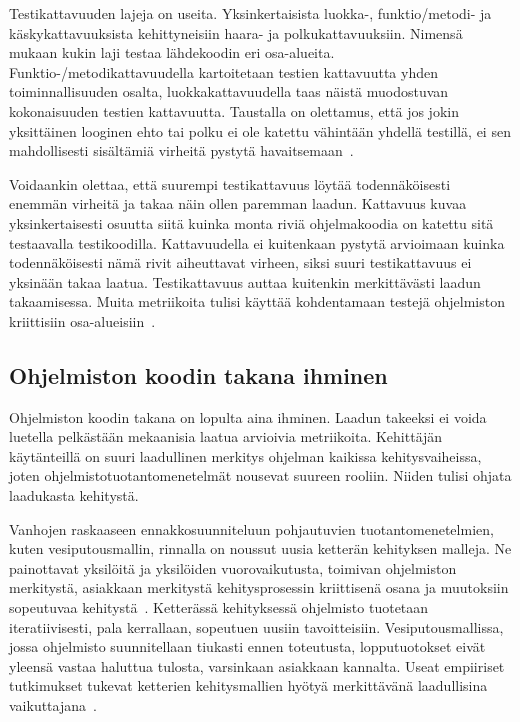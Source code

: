 \documentclass[finnish]{../tktltiki2}
\theoremstyle{definition}
\theoremstyle{remark}
\begin{document}
    Testikattavuuden lajeja on useita. Yksinkertaisista luokka-, funktio/metodi- ja käskykattavuuksista kehittyneisiin 
haara- ja polkukattavuuksiin. Nimensä mukaan kukin laji testaa lähdekoodin eri osa-alueita. Funktio-/metodikattavuu\-della 
kartoitetaan testien kattavuutta yhden toiminnallisuuden osalta, luokkakattavuudella taas näistä muodostuvan 
kokonaisuuden testien kattavuutta. Taustalla on olettamus, että jos jokin yksittäinen looginen ehto tai polku ei ole 
katettu vähintään yhdellä testillä, ei sen mahdollisesti sisältämiä virheitä pystytä havaitsemaan~\cite{MNDT09}.

    Voidaankin olettaa, että suurempi testikattavuus löytää todennäköisesti enemmän virheitä ja takaa näin ollen 
paremman laadun. Kattavuus kuvaa yksinkertaisesti osuutta siitä kuinka monta riviä ohjelmakoodia on katettu sitä 
testaavalla testikoodilla. Kattavuudella ei kuitenkaan pystytä arvioimaan kuinka todennäköisesti nämä rivit aiheuttavat 
virheen, siksi suuri testikattavuus ei yksinään takaa laatua. Testikattavuus auttaa kuitenkin merkittävästi laadun 
takaamisessa. Muita metriikoita tulisi käyttää kohdentamaan testejä ohjelmiston kriittisiin 
osa-alueisiin~\cite{NB07, MNDT09}.

\subsection{Ohjelmiston koodin takana ihminen}

Ohjelmiston koodin takana on lopulta aina ihminen.  Laadun takeeksi ei voida luetella pelkästään mekaanisia laatua 
arvioivia metriikoita. Kehittäjän käytänteillä on suuri laadullinen merkitys ohjelman kaikissa kehitysvaiheissa, joten 
ohjelmistotuotantomenetelmät nousevat suureen rooliin. Niiden tulisi ohjata laadukasta kehitystä.

    Vanhojen raskaaseen ennakkosuunniteluun pohjautuvien tuotantomenetelmien, kuten vesiputousmallin, rinnalla on 
noussut uusia ketterän kehityksen malleja. Ne painottavat yksilöitä ja yksilöiden vuorovaikutusta, toimivan ohjelmiston 
merkitystä, asiakkaan merkitystä kehitysprosessin kriittisenä osana ja muutoksiin sopeutuvaa kehitystä~\cite{BBB01}. 
Ketterässä kehityksessä ohjelmisto tuotetaan iteratiivisesti, pala kerrallaan, sopeutuen uusiin tavoitteisiin. 
Vesiputousmallissa, jossa ohjelmisto suunnitellaan tiukasti ennen toteutusta, lopputuotokset eivät yleensä vastaa 
haluttua tulosta, varsinkaan asiakkaan kannalta. Useat empiiriset tutkimukset tukevat ketterien kehitysmallien hyötyä 
merkittävänä laadullisina vaikuttajana~\cite{SS10}.
\end{document}
